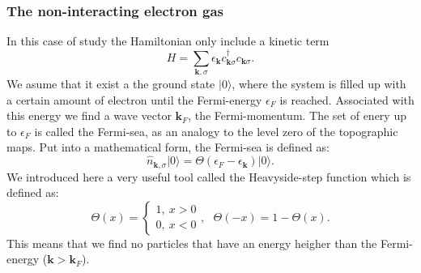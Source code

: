 \documentclass[../main.tex]{subfile}
\begin{document}
\subsubsection{The non-interacting electron gas}
In this case of study the Hamiltonian only include a kinetic term
\begin{equation}\label{eq:NonInteractingHamiltonian}
    H=\sum_{\bm{k},\sigma} \epsilon_{\bm{k}} c_{\bm{k}\sigma}^{\dagger}c_{\bm{k}\sigma}.
\end{equation}
We asume that it exist a the ground state $|0\rangle$, where the system is filled up with a certain amount of electron until the Fermi-energy $\epsilon_F$ is reached. Associated with this
energy we find a wave vector $\bm{k}_F$, the Fermi-momentum. The set of enery up to $\epsilon_F$ is called the Fermi-sea, as an analogy to the level zero of the topographic maps. 
Put into a mathematical form, the Fermi-sea is defined as:
\begin{equation}
    \hat{n}_{\bm{k},\sigma} |0\rangle = \Theta(\epsilon_F - \epsilon_{\bm{k}})|0\rangle.\label{eq:MomentumDistributionFree}
\end{equation}
We introduced here a very useful tool called the Heavyside-step function which is defined as: 
\begin{equation}\label{eq:Heavyside}
    \Theta(x) = \begin{cases}
        1, ~x > 0\\
        0, ~x < 0
    \end{cases} , ~~~ \Theta(-x) = 1 - \Theta(x).
\end{equation}
This means that we find no particles that have an energy heigher than the Fermi-energy ($\bm{k}>\bm{k}_F$).\\
\end{document}
